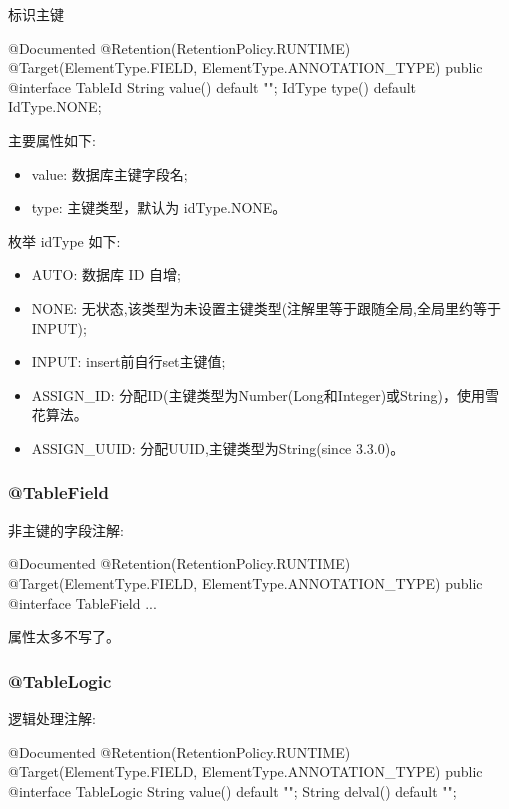 标识主键

\begin{Java}
@Documented
@Retention(RetentionPolicy.RUNTIME)
@Target({ElementType.FIELD, ElementType.ANNOTATION_TYPE})
public @interface TableId {
    String value() default "";
    IdType type() default IdType.NONE;
}
\end{Java}

主要属性如下:
\begin{itemize}
    \item value: 数据库主键字段名;
    \item type: 主键类型，默认为 idType.NONE。
\end{itemize}

枚举 idType 如下:
\begin{itemize}
    \item AUTO: 数据库 ID 自增;
    \item NONE: 无状态,该类型为未设置主键类型(注解里等于跟随全局,全局里约等于 INPUT);
    \item INPUT: insert前自行set主键值;
    \item ASSIGN\_ID: 分配ID(主键类型为Number(Long和Integer)或String)，使用雪花算法。
    \item ASSIGN\_UUID: 分配UUID,主键类型为String(since 3.3.0)。
\end{itemize}

\subsubsection{@TableField}

非主键的字段注解:

\begin{Java}
@Documented
@Retention(RetentionPolicy.RUNTIME)
@Target({ElementType.FIELD, ElementType.ANNOTATION_TYPE})
public @interface TableField { ... }
\end{Java}

属性太多不写了。

\subsubsection{@TableLogic}

逻辑处理注解:

\begin{Java}
@Documented
@Retention(RetentionPolicy.RUNTIME)
@Target({ElementType.FIELD, ElementType.ANNOTATION_TYPE})
public @interface TableLogic {
    String value() default "";
    String delval() default "";
}
\end{Java}

